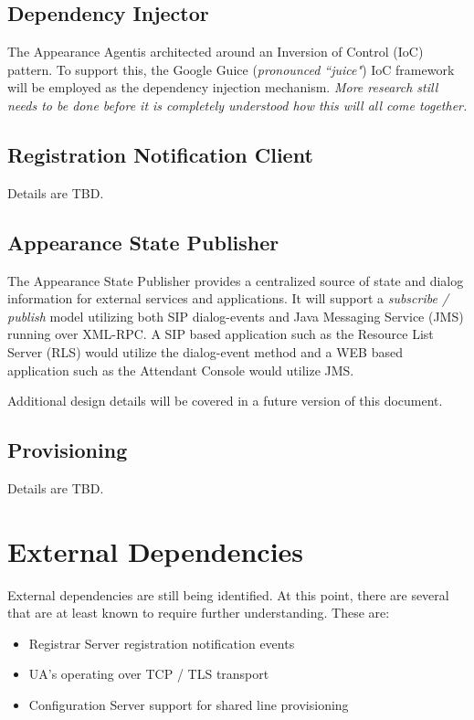 \documentclass[twoside,11pt]{article}
\newcommand{\PAA}{Appearance Agent\space}
\begin{document}
\subsection{Dependency Injector}
The \PAA is architected around an Inversion of Control (IoC) pattern.  To
support this, the Google Guice (\emph{pronounced ``juice"}) IoC framework will
be employed as the dependency injection mechanism.  \emph{More research still needs to be done before it is completely understood how this will all come together.}

\subsection{Registration Notification Client}
Details are TBD.

\subsection{Appearance State Publisher}
The Appearance State Publisher provides a centralized source of state and dialog information for
external services and applications.  It will support a \emph{subscribe / publish} model utilizing
both SIP dialog-events and Java Messaging Service (JMS) running over XML-RPC.  A SIP based
application such as the Resource List Server (RLS) would utilize the dialog-event method and a WEB
based application such as the Attendant Console would utilize JMS.

Additional design details will be covered in a future version of this document.

\subsection{Provisioning}
Details are TBD.

\section{External Dependencies}
External dependencies are still being identified.  At this point, there are several that are at
least known to require further understanding.  These are:

\begin{itemize}
  \item Registrar Server registration notification events
  \item UA's operating over TCP / TLS transport
  \item Configuration Server support for shared line provisioning
\end{itemize}
\end{document}
